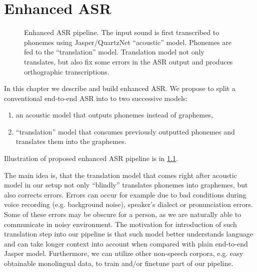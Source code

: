 \chapter{Enhanced ASR}
\label{chap:enhanced_asr}

\begin{figure}[h]
	\centering
	\caption{Enhanced ASR pipeline. The input sound is first transcribed to phonemes using Jasper/QuartzNet ``acoustic'' model. Phonemes are fed to the ``translation'' model. Translation model not only translates, but also fix some errors in the ASR output and produces orthographic transcriptions.}
	\label{fig:asr_enhanced_pipeline}
\end{figure} 


In this chapter we describe and build enhanced ASR. We propose to split a conventional end-to-end ASR into to two successive models: 

\begin{enumerate}
	\item an acoustic model that outputs phonemes instead of graphemes,
	\item ``translation'' model that consumes previously outputted phonemes and translates them into the graphemes.
\end{enumerate}

Illustration of proposed enhanced ASR pipeline is in \cref{fig:asr_enhanced_pipeline}.

The main idea is, that the translation model that comes right after acoustic model in our setup not only ``blindly'' translates phonemes into graphemes, but also corrects errors. Errors can occur for example due to bad conditions during voice recording (e.g. background noise), speaker's dialect or pronunciation errors. Some of these errors may be obscure for a person, as we are naturally able to communicate in noisy environment. The motivation for introduction of such translation step into our pipeline is that such model better understands language and can take longer context into account when compared with plain end-to-end Jasper model. Furthermore, we can utilize other non-speech corpora, e.g. easy obtainable monolingual data, to train and/or finetune part of our pipeline.

